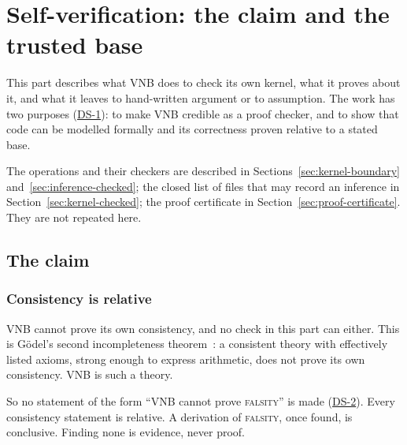 \providecommand{\DS}[1]{\hyperref[ds:#1]{DS-#1}}
\providecommand{\VNBfig}[3]{\[\frac{\displaystyle #2}{\displaystyle #3}\;\;\mbox{\texttt{#1}}\]}
\providecommand{\VNBnohyp}{\phantom{\Gamma}}

\chapter{Self-verification: the claim and the trusted base}
\label{ch:meta-claim}

This part describes what VNB does to check its own kernel, what it
proves about it, and what it leaves to hand-written argument or to
assumption.  The work has two purposes (\DS{1}): to make VNB credible as
a proof checker, and to show that code can be modelled formally and its
correctness proven relative to a stated base.

The operations and their checkers are described in
Sections~\ref{sec:kernel-boundary} and~\ref{sec:inference-checked}; the
closed list of files that may record an inference in
Section~\ref{sec:kernel-checked}; the proof certificate in
Section~\ref{sec:proof-certificate}.  They are not repeated here.

\section{The claim}\label{sec:meta-the-claim}

\subsection{Consistency is relative}\label{sec:meta-relative}

VNB cannot prove its own consistency, and no check in this part can
either.  This is G\"odel's second incompleteness theorem~\cite{Godel1931}:
a consistent theory with effectively listed axioms, strong enough to
express arithmetic, does not prove its own consistency.  VNB is such a
theory.

So no statement of the form ``VNB cannot prove \textsc{falsity}'' is made
(\DS{2}).  Every consistency statement is relative.  A derivation of
\textsc{falsity}, once found, is conclusive.  Finding none is evidence,
never proof.

